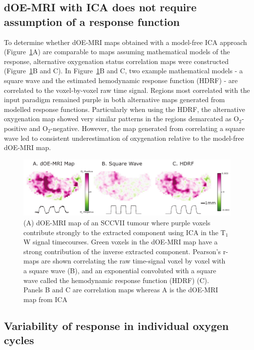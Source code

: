 \subsection{dOE-MRI with \acs{ICA} does not require assumption of a response function}
To determine whether \acs{dOE-MRI} maps obtained with a model-free \acs{ICA} approach (Figure~\ref{fig_correlation}A) are comparable to maps assuming mathematical models of the response, alternative oxygenation status correlation maps were constructed (Figure~\ref{fig_correlation}B and C). 
In Figure~\ref{fig_correlation}B and C, two example mathematical models - a square wave and the estimated hemodynamic response function (HDRF) - are correlated to the voxel-by-voxel raw time signal. 
Regions most correlated with the input paradigm remained purple in both alternative maps generated from modelled response functions.
Particularly when using the HDRF, the alternative oxygenation map showed very similar patterns in the regions demarcated as O$_2$-positive and O$_2$-negative. 
However, the map generated from correlating a square wave led to consistent underestimation of oxygenation relative to the model-free \acs{dOE-MRI} map.

\begin{figure}[htbp]
   \centering
   \includegraphics[width=\textwidth]{oemri_thesis1/oemri_thesis1-images/fig3_correlation.pdf} %
   \caption{(A) \acs{dOE-MRI} map of an SCCVII tumour where purple voxels contribute strongly to the extracted component using \acs{ICA} in the T$_1$W signal timecourses. 
Green voxels in the \acs{dOE-MRI} map have a strong contribution of the inverse extracted component. Pearson's r-maps are shown correlating the raw time-signal voxel by voxel with a square wave (B), and an exponential convoluted with a square wave called the hemodynamic response function (HDRF) (C).
Panels B and C are correlation maps whereas A is the \acs{dOE-MRI} map from \acs{ICA}
   \label{fig_correlation}}
\end{figure}

\subsection{Variability of response in individual oxygen cycles}

